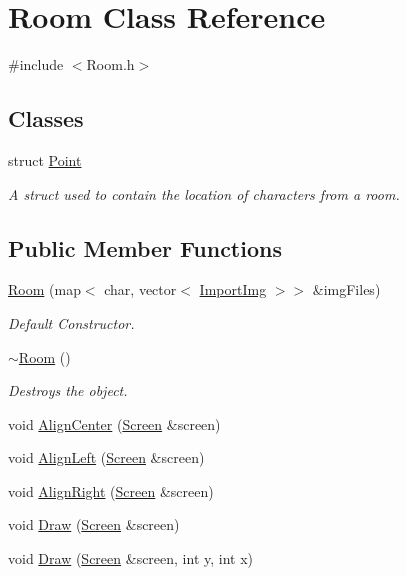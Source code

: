 \hypertarget{classRoom}{\section{Room Class Reference}
\label{classRoom}
}


{\ttfamily \#include $<$Room.\-h$>$}

\subsection*{Classes}
\begin{DoxyCompactItemize}
\item 
struct \hyperlink{structRoom_1_1Point}{Point}
\begin{DoxyCompactList}\small\item\em A struct used to contain the location of characters from a room. \end{DoxyCompactList}\end{DoxyCompactItemize}
\subsection*{Public Member Functions}
\begin{DoxyCompactItemize}
\item 
\hyperlink{classRoom_aea4edd64689b754ff3b7380893591f32}{Room} (map$<$ char, vector$<$ \hyperlink{classImportImg}{Import\-Img} $>$$>$ \&img\-Files)
\begin{DoxyCompactList}\small\item\em Default Constructor. \end{DoxyCompactList}\item 
\hyperlink{classRoom_a67d5da09983cc53097807fd43ba5481a}{$\sim$\-Room} ()
\begin{DoxyCompactList}\small\item\em Destroys the object. \end{DoxyCompactList}\item 
void \hyperlink{classRoom_a17b89dc15eb31112aa41abc98e7ba74e}{Align\-Center} (\hyperlink{classScreen}{Screen} \&screen)
\item 
void \hyperlink{classRoom_a21704e4eb32706d1ae2b6f3f4587f9d5}{Align\-Left} (\hyperlink{classScreen}{Screen} \&screen)
\item 
void \hyperlink{classRoom_a6e36bef089855f1eacb6aaddad079330}{Align\-Right} (\hyperlink{classScreen}{Screen} \&screen)
\item 
void \hyperlink{classRoom_a22685a17cc047823ebbd551219377d6c}{Draw} (\hyperlink{classScreen}{Screen} \&screen)
\item 
void \hyperlink{classRoom_aa77030565e65008df509a60d4a01a668}{Draw} (\hyperlink{classScreen}{Screen} \&screen, int y, int x)
\end{DoxyCompactItemize}
